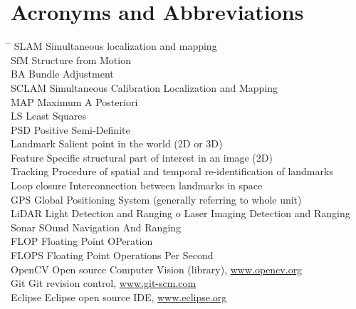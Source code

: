 \section*{Acronyms and Abbreviations}
\label{sec:acronyms}
\begin{tabbing}
	\hspace*{3.5cm}		\= \kill
	SLAM \> Simultaneous localization and mapping \\[1ex]
    SfM \> Structure from Motion \\[1ex]
    BA \> Bundle Adjustment \\[1ex]
    SCLAM \> Simultaneous Calibration Localization and Mapping \\[1ex]
    MAP \> Maximum A Posteriori \\[1ex]
    LS \> Least Squares \\[1ex]
    PSD \> Positive Semi-Definite \\[1ex]
    Landmark \> Salient point in the world (2D or 3D) \\[1ex]
	Feature \> Specific structural part of interest in an image (2D) \\[1ex]
	Tracking \> Procedure of spatial and temporal re-identification of landmarks \\[1ex]
	Loop closure \> Interconnection between landmarks in space \\[1ex]
	GPS \> Global Positioning System (generally referring to whole unit) \\[1ex]
    LiDAR \> Light Detection and Ranging o Laser Imaging Detection and Ranging \\[1ex]
    Sonar \> SOund Navigation And Ranging \\[1ex]
    FLOP \> Floating Point OPeration \\[1ex]
    FLOPS \> Floating Point Operations Per Second \\[1ex]
	OpenCV  \> Open source Computer Vision (library), \url{www.opencv.org} \\[1ex]
	Git  \> Git revision control, \url{www.git-scm.com} \\[1ex]
	Eclipse \> Eclipse open source IDE, \url{www.eclipse.org}
\end{tabbing}